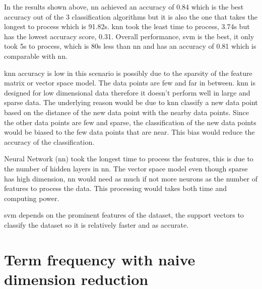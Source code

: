 In the results shown above, \ac{nn} achieved an accuracy of 0.84 which is the best accuracy out of the 3 classification algorithms but it is also the one that takes the longest to process which is 91.82s. \Ac{knn} took the least time to process, 3.74s but has the lowest accuracy score, 0.31. Overall performance, \ac{svm} is the best, it only took 5s to process, which is 80s less than \ac{nn} and has an accuracy of 0.81 which is comparable with \ac{nn}. 

\Ac{knn} accuracy is low in this scenario is possibly due to the sparsity of the feature matrix or vector space model. The data points are few and far in between. \Ac{knn} is designed for low dimensional data therefore it doesn't perform well in large and sparse data. The underlying reason would be due to \ac{knn} classify a new data point based on the distance of the new data point with the nearby data points. Since the other data points are few and sparse, the classification of the new data points would be biased to the few data points that are near. This bias would reduce the accuracy of the classification. \cite{knnDrawback}

Neural Network (\ac{nn}) took the longest time to process the features, this is due to the number of hidden layers in \ac{nn}. The vector space model even though sparse has high dimension, \ac{nn} would need as much if not more neurons as the number of features to process the data. This processing would takes both time and computing power.

\Ac{svm} depends on the prominent features of the dataset, the support vectors to classify the dataset so it is relatively faster and as accurate.

\section{Term frequency with naive dimension reduction}

